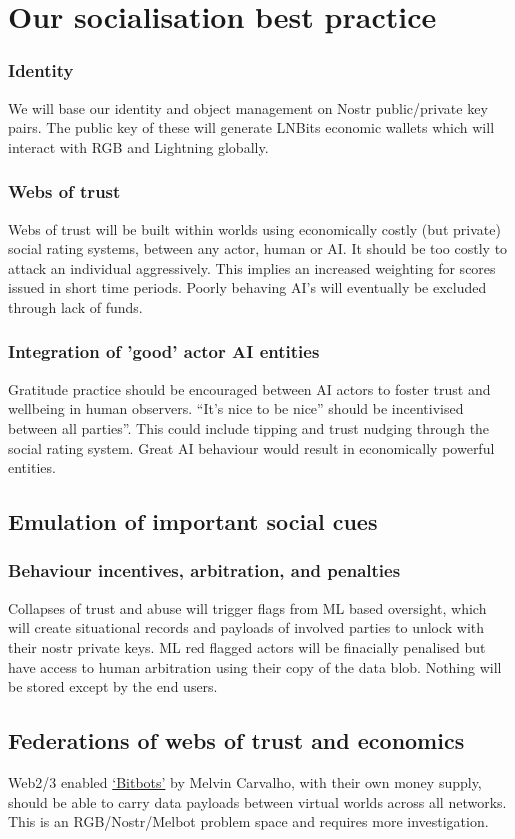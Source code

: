 \section{Our socialisation best practice}
\subsubsection{Identity}
We will base our identity and object management on Nostr public/private key pairs. The public key of these will generate LNBits economic wallets which will interact with RGB and Lightning globally.
\subsubsection{Webs of trust}
Webs of trust will be built within worlds using economically costly (but private) social rating systems, between any actor, human or AI. It should be too costly to attack an individual aggressively. This implies an increased weighting for scores issued in short time periods. Poorly behaving AI's will eventually be excluded through lack of funds.
\subsubsection{Integration of 'good' actor AI entities}
Gratitude practice should be encouraged between AI actors to foster trust and wellbeing in human observers. ``It's nice to be nice'' should be incentivised between all parties''. This could include tipping and trust nudging through the social rating system. Great AI behaviour would result in economically powerful entities.
\subsection{Emulation of important social cues}
\subsubsection{Behaviour incentives, arbitration, and penalties}
Collapses of trust and abuse will trigger flags from ML based oversight, which will create situational records and payloads of involved parties to unlock with their nostr private keys. ML red flagged actors will be finacially penalised but have access to human arbitration using their copy of the data blob. Nothing will be stored except by the end users.
\subsection{Federations of webs of trust and economics}
Web2/3 enabled \href{https://bitbots.org}{`Bitbots'} by Melvin Carvalho, with their own money supply, should be able to carry data payloads between virtual worlds across all networks. This is an RGB/Nostr/Melbot problem space and requires more investigation. 
